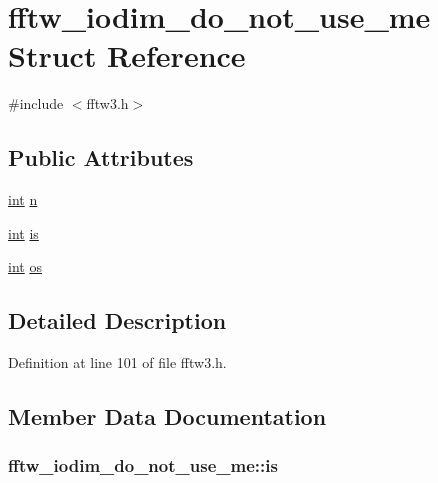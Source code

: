 \hypertarget{structfftw__iodim__do__not__use__me}{}\section{fftw\+\_\+iodim\+\_\+do\+\_\+not\+\_\+use\+\_\+me Struct Reference}
\label{structfftw__iodim__do__not__use__me}


{\ttfamily \#include $<$fftw3.\+h$>$}

\subsection*{Public Attributes}
\begin{DoxyCompactItemize}
\item 
\hyperlink{xmltok_8h_a5a0d4a5641ce434f1d23533f2b2e6653}{int} \hyperlink{structfftw__iodim__do__not__use__me_aa9ceb61afc1731380bdb48305aa40ce0}{n}
\item 
\hyperlink{xmltok_8h_a5a0d4a5641ce434f1d23533f2b2e6653}{int} \hyperlink{structfftw__iodim__do__not__use__me_a7571fd050be3b9c9486d41086b657099}{is}
\item 
\hyperlink{xmltok_8h_a5a0d4a5641ce434f1d23533f2b2e6653}{int} \hyperlink{structfftw__iodim__do__not__use__me_acff6a6b2225f610d3bee5380e801abb4}{os}
\end{DoxyCompactItemize}


\subsection{Detailed Description}


Definition at line 101 of file fftw3.\+h.



\subsection{Member Data Documentation}
\subsubsection[{\texorpdfstring{is}{is}}]{ fftw\+\_\+iodim\+\_\+do\+\_\+not\+\_\+use\+\_\+me\+::is}\hypertarget{structfftw__iodim__do__not__use__me_a7571fd050be3b9c9486d41086b657099}{}\label{structfftw__iodim__do__not__use__me_a7571fd050be3b9c9486d41086b657099}


